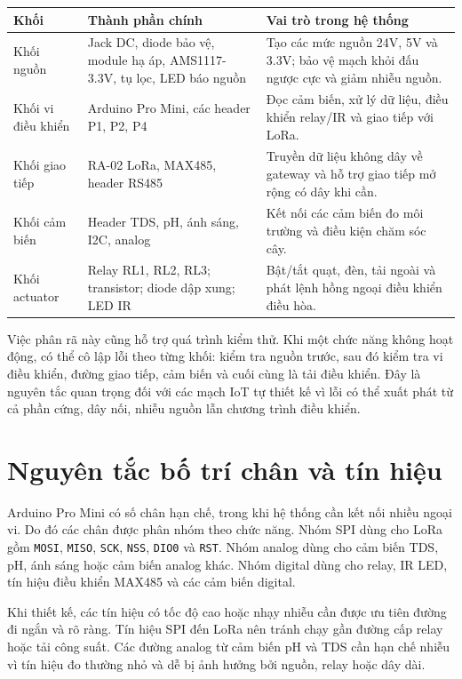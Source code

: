 \begin{longtable}{|p{3.5cm}|p{4.2cm}|p{5.2cm}|}
\hline
\textbf{Khối} & \textbf{Thành phần chính} & \textbf{Vai trò trong hệ thống} \\
\hline
Khối nguồn & Jack DC, diode bảo vệ, module hạ áp, AMS1117-3.3V, tụ lọc, LED báo nguồn & Tạo các mức nguồn 24V, 5V và 3.3V; bảo vệ mạch khỏi đấu ngược cực và giảm nhiễu nguồn. \\
\hline
Khối vi điều khiển & Arduino Pro Mini, các header P1, P2, P4 & Đọc cảm biến, xử lý dữ liệu, điều khiển relay/IR và giao tiếp với LoRa. \\
\hline
Khối giao tiếp & RA-02 LoRa, MAX485, header RS485 & Truyền dữ liệu không dây về gateway và hỗ trợ giao tiếp mở rộng có dây khi cần. \\
\hline
Khối cảm biến & Header TDS, pH, ánh sáng, I2C, analog & Kết nối các cảm biến đo môi trường và điều kiện chăm sóc cây. \\
\hline
Khối actuator & Relay RL1, RL2, RL3; transistor; diode dập xung; LED IR & Bật/tắt quạt, đèn, tải ngoài và phát lệnh hồng ngoại điều khiển điều hòa. \\
\hline
\end{longtable}

Việc phân rã này cũng hỗ trợ quá trình kiểm thử. Khi một chức năng không hoạt động, có thể cô lập lỗi theo từng khối: kiểm tra nguồn trước, sau đó kiểm tra vi điều khiển, đường giao tiếp, cảm biến và cuối cùng là tải điều khiển. Đây là nguyên tắc quan trọng đối với các mạch IoT tự thiết kế vì lỗi có thể xuất phát từ cả phần cứng, dây nối, nhiễu nguồn lẫn chương trình điều khiển.

\section{Nguyên tắc bố trí chân và tín hiệu}
Arduino Pro Mini có số chân hạn chế, trong khi hệ thống cần kết nối nhiều ngoại vi. Do đó các chân được phân nhóm theo chức năng. Nhóm SPI dùng cho LoRa gồm \texttt{MOSI}, \texttt{MISO}, \texttt{SCK}, \texttt{NSS}, \texttt{DIO0} và \texttt{RST}. Nhóm analog dùng cho cảm biến TDS, pH, ánh sáng hoặc cảm biến analog khác. Nhóm digital dùng cho relay, IR LED, tín hiệu điều khiển MAX485 và các cảm biến digital.

Khi thiết kế, các tín hiệu có tốc độ cao hoặc nhạy nhiễu cần được ưu tiên đường đi ngắn và rõ ràng. Tín hiệu SPI đến LoRa nên tránh chạy gần đường cấp relay hoặc tải công suất. Các đường analog từ cảm biến pH và TDS cần hạn chế nhiễu vì tín hiệu đo thường nhỏ và dễ bị ảnh hưởng bởi nguồn, relay hoặc dây dài.

